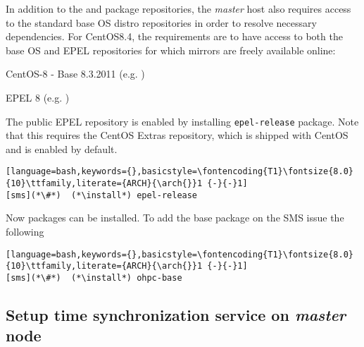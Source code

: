 \documentclass[letterpaper]{article}
\newcommand{\baseOS}{CentOS8.4}
\newcommand{\arch}{x86\_64}
\newcommand{\install}{dnf -y install}
\begin{document}


In addition to the \OHPC{} and \xCAT{} package repositories, the {\em master} host also
requires access to the standard base OS distro repositories in order to resolve
necessary dependencies. For \baseOS{}, the requirements are to have access to
both the base OS and EPEL repositories for which mirrors are freely available online:

\begin{itemize*}
\item CentOS-8 - Base 8.3.2011
  (e.g. \href{http://mirror.centos.org/centos-8/8/BaseOS/x86\_64/os}
             {\color{blue}{http://mirror.centos.org/centos-8/8/BaseOS/x86\_64/os}} )
\item EPEL 8 (e.g. \href{http://download.fedoraproject.org/pub/epel/8/Everything/x86\_64}
                        {\color{blue}{http://download.fedoraproject.org/pub/epel/8/Everything/x86\_64}} )
\end{itemize*}

\noindent The public EPEL repository is enabled by installing
\texttt{epel-release} package. Note that this requires the CentOS Extras
repository, which is shipped with CentOS and is enabled by default.

\begin{lstlisting}[language=bash,keywords={},basicstyle=\fontencoding{T1}\fontsize{8.0}{10}\ttfamily,literate={ARCH}{\arch{}}1 {-}{-}1]
[sms](*\#*)  (*\install*) epel-release
\end{lstlisting}

Now \OHPC{} packages can be installed. To add the base package on the SMS
issue the following
\begin{lstlisting}[language=bash,keywords={},basicstyle=\fontencoding{T1}\fontsize{8.0}{10}\ttfamily,literate={ARCH}{\arch{}}1 {-}{-}1]
[sms](*\#*)  (*\install*) ohpc-base
\end{lstlisting}





\subsection{Setup time synchronization service on {\em master} node} \label{sec:add_ntp}

\end{document}
